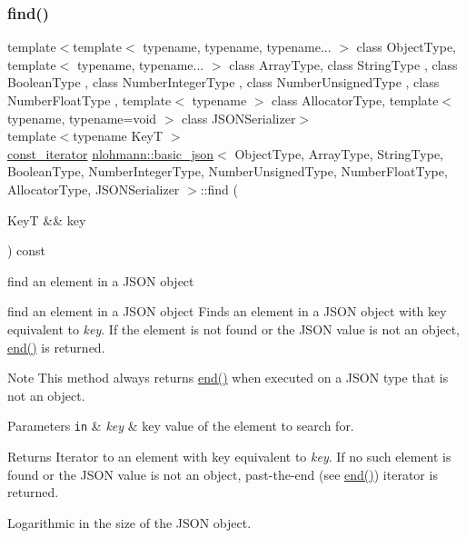 \subsubsection{\texorpdfstring{find()}{find()}\hspace{0.1cm}{\footnotesize\ttfamily [2/2]}}
{\footnotesize\ttfamily template$<$template$<$ typename, typename, typename... $>$ class Object\+Type, template$<$ typename, typename... $>$ class Array\+Type, class String\+Type , class Boolean\+Type , class Number\+Integer\+Type , class Number\+Unsigned\+Type , class Number\+Float\+Type , template$<$ typename $>$ class Allocator\+Type, template$<$ typename, typename=void $>$ class J\+S\+O\+N\+Serializer$>$ \\
template$<$typename KeyT $>$ \\
\hyperlink{classnlohmann_1_1basic__json_a41a70cf9993951836d129bb1c2b3126a}{const\+\_\+iterator} \hyperlink{classnlohmann_1_1basic__json}{nlohmann\+::basic\+\_\+json}$<$ Object\+Type, Array\+Type, String\+Type, Boolean\+Type, Number\+Integer\+Type, Number\+Unsigned\+Type, Number\+Float\+Type, Allocator\+Type, J\+S\+O\+N\+Serializer $>$\+::find (\begin{DoxyParamCaption}\item[{KeyT \&\&}]{key }\end{DoxyParamCaption}) const\hspace{0.3cm}{\ttfamily [inline]}}



find an element in a J\+S\+ON object 

find an element in a J\+S\+ON object Finds an element in a J\+S\+ON object with key equivalent to {\itshape key}. If the element is not found or the J\+S\+ON value is not an object, \hyperlink{classnlohmann_1_1basic__json_a13e032a02a7fd8a93fdddc2fcbc4763c}{end()} is returned.

\begin{DoxyNote}{Note}
This method always returns \hyperlink{classnlohmann_1_1basic__json_a13e032a02a7fd8a93fdddc2fcbc4763c}{end()} when executed on a J\+S\+ON type that is not an object.
\end{DoxyNote}

\begin{DoxyParams}[1]{Parameters}
\mbox{\tt in}  & {\em key} & key value of the element to search for.\\
\hline
\end{DoxyParams}
\begin{DoxyReturn}{Returns}
Iterator to an element with key equivalent to {\itshape key}. If no such element is found or the J\+S\+ON value is not an object, past-\/the-\/end (see \hyperlink{classnlohmann_1_1basic__json_a13e032a02a7fd8a93fdddc2fcbc4763c}{end()}) iterator is returned.
\end{DoxyReturn}
Logarithmic in the size of the J\+S\+ON object.

